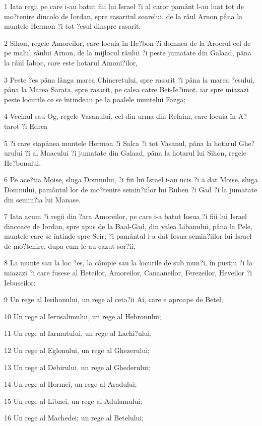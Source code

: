 \par 1 Iata regii pe care i-au batut fiii lui Israel ?i al caror pamânt l-au luat tot de mo?tenire dincolo de Iordan, spre rasaritul soarelui, de la râul Arnon pâna la muntele Hermon ?i tot ?esul dinspre rasarit:
\par 2 Sihon, regele Amoreilor, care locuia în He?bon ?i domnea de la Aroerul cel de pe malul râului Arnon, de la mijlocul râului ?i peste jumatate din Galaad, pâna la râul Iaboc, care este hotarul Amoni?ilor,
\par 3 Peste ?es pâna lânga marea Chineretului, spre rasarit ?i pâna la marea ?esului, pâna la Marea Sarata, spre rasarit, pe calea catre Bet-Ie?imot, iar spre miazazi peste locurile ce se întindeau pe la poalele muntelui Fazga;
\par 4 Vecinul sau Og, regele Vasanului, cel din urma din Refaim, care locuia în A?tarot ?i Edrea
\par 5 ?i care stapânea muntele Hermon ?i Salca ?i tot Vasanul, pâna la hotarul Ghe?urului ?i al Maacului ?i jumatate din Galaad, pâna la hotarul lui Sihon, regele He?bonului.
\par 6 Pe ace?tia Moise, sluga Domnului, ?i fiii lui Israel i-au ucis ?i a dat Moise, sluga Domnului, pamântul lor de mo?tenire semin?iilor lui Ruben ?i Gad ?i la jumatate din semin?ia lui Manase.
\par 7 Iata acum ?i regii din ?ara Amoreilor, pe care i-a batut Iosua ?i fiii lui Israel dincoace de Iordan, spre apus de la Baal-Gad, din valea Libanului, pâna la Pele, muntele care se întinde spre Seir; ?i pamântul l-a dat Iosua semin?iilor lui Israel de mo?tenire, dupa cum le-au cazut sor?ii,
\par 8 La munte sau la loc ?es, la câmpie sau la locurile de sub mun?i, în pustiu ?i la miazazi ?i care fusese al Heteilor, Amoreilor, Canaaneilor, Ferezeilor, Heveilor ?i Iebuseilor:
\par 9 Un rege al Ierihonului, un rege al ceta?ii Ai, care e aproape de Betel;
\par 10 Un rege al Ierusalimului, un rege al Hebronului;
\par 11 Un rege al Iarmutului, un rege al Lachi?ului;
\par 12 Un rege al Eglonului, un rege al Ghezerului;
\par 13 Un rege al Debirului, un rege al Ghederului;
\par 14 Un rege al Hormei, un rege al Aradului;
\par 15 Un rege al Libnei, un rege al Adulamului;
\par 16 Un rege al Machedei; un rege al Betelului;

